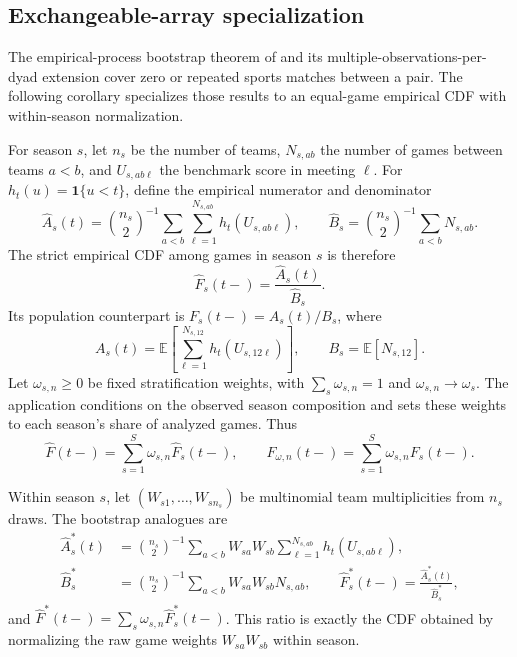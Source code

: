 \documentclass[12pt,letterpaper]{article}
\newcommand{\E}{\mathbb{E}}
\theoremstyle{plain}
\begin{document}
\subsection{Exchangeable-array specialization}

The empirical-process bootstrap theorem of \citet{DaveziesDHAultfoeuilleGuyonvarch2021} and its multiple-observations-per-dyad extension cover zero or repeated sports matches between a pair.
The following corollary specializes those results to an equal-game empirical CDF with within-season normalization.

For season $s$, let $n_s$ be the number of teams, $N_{s,ab}$ the number of games between teams $a<b$, and $U_{s,ab\ell}$ the benchmark score in meeting $\ell$.
For $h_t(u)=\mathbf 1\{u<t\}$, define the empirical numerator and denominator
\[
\widehat A_s(t)
=\binom{n_s}{2}^{-1}
  \sum_{a<b}\sum_{\ell=1}^{N_{s,ab}}h_t(U_{s,ab\ell}),
\qquad
\widehat B_s
=\binom{n_s}{2}^{-1}\sum_{a<b}N_{s,ab}.
\]
The strict empirical CDF among games in season $s$ is therefore
\[
\widehat F_s(t-)=\frac{\widehat A_s(t)}{\widehat B_s}.
\]
Its population counterpart is $F_s(t-)=A_s(t)/B_s$, where
\[
A_s(t)=\E\!\left[\sum_{\ell=1}^{N_{s,12}}h_t(U_{s,12\ell})\right],
\qquad
B_s=\E[N_{s,12}].
\]
Let $\omega_{s,n}\ge0$ be fixed stratification weights, with $\sum_s\omega_{s,n}=1$ and $\omega_{s,n}\to\omega_s$.
The application conditions on the observed season composition and sets these weights to each season's share of analyzed games.
Thus
\[
\widehat F(t-)=\sum_{s=1}^S\omega_{s,n}\widehat F_s(t-),
\qquad
F_{\omega,n}(t-)=\sum_{s=1}^S\omega_{s,n}F_s(t-).
\]

Within season $s$, let $(W_{s1},\ldots,W_{sn_s})$ be multinomial team multiplicities from $n_s$ draws.
The bootstrap analogues are
\begin{align*}
\widehat A_s^*(t)
&=\binom{n_s}{2}^{-1}
  \sum_{a<b}W_{sa}W_{sb}
  \sum_{\ell=1}^{N_{s,ab}}h_t(U_{s,ab\ell}),\\
\widehat B_s^*
&=\binom{n_s}{2}^{-1}
  \sum_{a<b}W_{sa}W_{sb}N_{s,ab},
\qquad
\widehat F_s^*(t-)=\frac{\widehat A_s^*(t)}{\widehat B_s^*},
\end{align*}
and $\widehat F^*(t-)=\sum_s\omega_{s,n}\widehat F_s^*(t-)$.
This ratio is exactly the CDF obtained by normalizing the raw game weights $W_{sa}W_{sb}$ within season.
\end{document}
